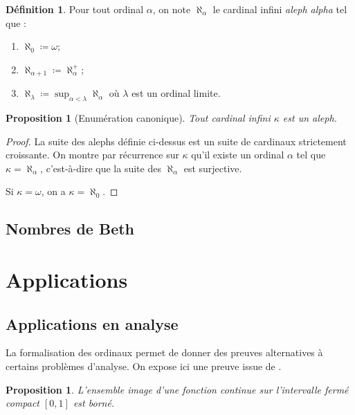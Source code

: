 \documentclass{article}
\theoremstyle{definition}
\newtheorem{definition}[subsubsection]{Définition}
\theoremstyle{plain}
\newtheorem{proposition}[subsubsection]{Proposition}
\theoremstyle{plain}
\theoremstyle{plain}
\theoremstyle{plain}
\theoremstyle{plain}
\begin{document}
\begin{definition}
Pour tout ordinal \( \alpha \), on note \( \aleph_{\alpha} \) le cardinal infini \textit{aleph alpha} tel que :
	\begin{enumerate}[label = (\roman*) ]
		\item \( \aleph_{0} \coloneqq \omega \);
		\item \( \aleph_{\alpha + 1} \coloneqq \aleph_{\alpha}^{+} \);
		\item \( \aleph_{\lambda} \coloneqq \sup_{\alpha < \lambda} \aleph_{\alpha} \) où \( \lambda \) est un ordinal limite.
	\end{enumerate}
\end{definition}

\begin{proposition}[Enumération canonique]
	Tout cardinal infini \( \kappa \) est un aleph.
\end{proposition}

\begin{proof}
La suite des alephs définie ci-dessus est un suite de cardinaux strictement croissante. On montre par récurrence sur \( \kappa \) qu'il existe un ordinal \( \alpha \) tel que \( \kappa = \aleph_{\alpha} \), c'est-à-dire que la suite des \( \aleph_{\alpha} \) est surjective.

\par Si \( \kappa = \omega \), on a \( \kappa = \aleph_{0} \).
\end{proof}


\subsection{Nombres de Beth}

\clearpage

\section{Applications}
\subsection{Applications en analyse}

\par La formalisation des ordinaux permet de donner des preuves alternatives à certains problèmes d'analyse. On expose ici une preuve issue de \cite{gowers2010ordinals}.

\begin{proposition}
	L'ensemble image d'une fonction continue sur l'intervalle fermé compact \( [0,1] \) est borné.
\end{proposition}
\end{document}
